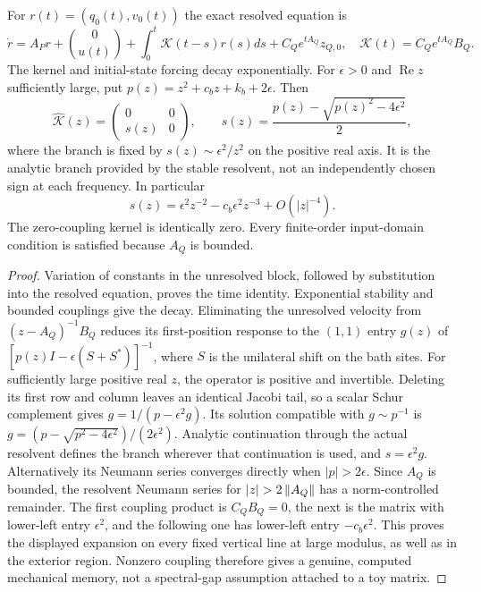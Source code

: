 \begin{theorem}\label{thm:r35-memory}
For $r(t)=(q_0(t),v_0(t))$ the exact resolved equation is
\[
 \dot r=A_Pr+\binom0{u(t)}+
       \int_0^t\mathcal K(t-s)r(s)ds+C_Qe^{tA_Q}z_{Q,0},
 \quad \mathcal K(t)=C_Qe^{tA_Q}B_Q.
\]
The kernel and initial-state forcing decay exponentially. For $\epsilon>0$ and $\operatorname{Re}z$ sufficiently large, put $p(z)=z^2+c_bz+k_b+2\epsilon$. Then
\[
 \widehat{\mathcal K}(z)=
 \begin{pmatrix}0&0\\s(z)&0\end{pmatrix},\qquad
 s(z)=\frac{p(z)-\sqrt{p(z)^2-4\epsilon^2}}2,
\]
where the branch is fixed by $s(z)\sim\epsilon^2/z^2$ on the positive real axis. It is the analytic branch provided by the stable resolvent, not an independently chosen sign at each frequency. In particular
\[
 s(z)=\epsilon^2z^{-2}-c_b\epsilon^2z^{-3}+O(|z|^{-4}).
\]
The zero-coupling kernel is identically zero. Every finite-order input-domain condition is satisfied because $A_Q$ is bounded.
\end{theorem}
\begin{proof}
Variation of constants in the unresolved block, followed by substitution into the resolved equation, proves the time identity. Exponential stability and bounded couplings give the decay. Eliminating the unresolved velocity from $(z-A_Q)^{-1}B_Q$ reduces its first-position response to the $(1,1)$ entry $g(z)$ of
$[p(z)I-\epsilon(S+S^*)]^{-1}$, where $S$ is the unilateral shift on the bath sites. For sufficiently large positive real $z$, the operator is positive and invertible. Deleting its first row and column leaves an identical Jacobi tail, so a scalar Schur complement gives $g=1/(p-\epsilon^2g)$. Its solution compatible with $g\sim p^{-1}$ is
$g=(p-\sqrt{p^2-4\epsilon^2})/(2\epsilon^2)$. Analytic continuation through the actual resolvent defines the branch wherever that continuation is used, and $s=\epsilon^2g$. Alternatively its Neumann series converges directly when $|p|>2\epsilon$.
Since $A_Q$ is bounded, the resolvent Neumann series for $|z|>2\norm{A_Q}$ has a norm-controlled remainder. The first coupling product is $C_QB_Q=0$, the next is the matrix with lower-left entry $\epsilon^2$, and the following one has lower-left entry $-c_b\epsilon^2$. This proves the displayed expansion on every fixed vertical line at large modulus, as well as in the exterior region. Nonzero coupling therefore gives a genuine, computed mechanical memory, not a spectral-gap assumption attached to a toy matrix.
\end{proof}

